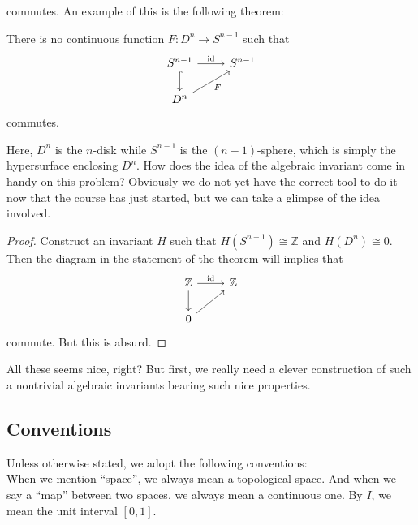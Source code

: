 commutes.
An example of this is the following theorem:
\begin{theorem}
    There is no continuous function $F:D^n\to S^{n-1}$ such that
    \[
        \begin{tikzcd}
            S^{n-1} \arrow[hookrightarrow]{d} \arrow{r}{\operatorname{id}} & S^{n-1}\\
            D^n \arrow[swap]{ur}{F}
        \end{tikzcd}
    \]
    commutes.
\end{theorem}
Here, $D^n$ is the $n$-disk while $S^{n-1}$ is the $(n-1)$-sphere, which is simply the hypersurface enclosing $D^n$.
How does the idea of the algebraic invariant come in handy on this problem?
Obviously we do not yet have the correct tool to do it now that the course has just started, but we can take a glimpse of the idea involved.
\begin{proof}
    Construct an invariant $H$ such that $H(S^{n-1})\cong\mathbb Z$ and $H(D^n)\cong 0$.
    Then the diagram in the statement of the theorem will implies that
    \[
        \begin{tikzcd}
            \mathbb Z\arrow{d} \arrow{r}{\operatorname{id}} & \mathbb Z\\
            0 \arrow{ur}
        \end{tikzcd}
    \]
    commute.
    But this is absurd.
\end{proof}
All these seems nice, right?
But first, we really need a clever construction of such a nontrivial algebraic invariants bearing such nice properties.
\subsection{Conventions}
Unless otherwise stated, we adopt the following conventions:\\
When we mention ``space'', we always mean a topological space.
And when we say a ``map'' between two spaces, we always mean a continuous one.
By $I$, we mean the unit interval $[0,1]$.